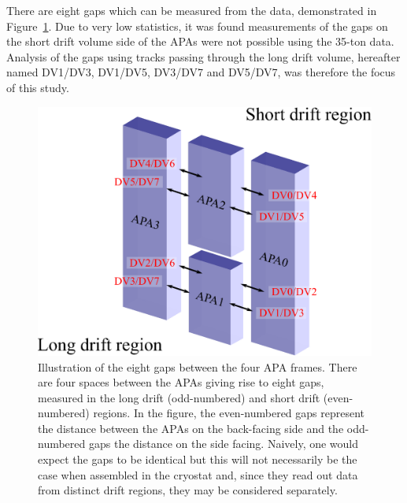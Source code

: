There are eight gaps which can be measured from the data, demonstrated in Figure~\ref{fig:APAGapCrossingGaps}.  Due to very low statistics, it was found measurements of the gaps on the short drift volume side of the APAs were not possible using the 35-ton data.  Analysis of the gaps using tracks passing through the long drift volume, hereafter named DV1/DV3, DV1/DV5, DV3/DV7 and DV5/DV7, was therefore the focus of this study.

\begin{figure}
  \centering
  \includegraphics[width=12cm]{APAGapCrossingGaps.eps}
  \caption{Illustration of the eight gaps between the four APA frames.  There are four spaces between the APAs giving rise to eight gaps, measured in the long drift (odd-numbered) and short drift (even-numbered) regions.  In the figure, the even-numbered gaps represent the distance between the APAs on the back-facing side and the odd-numbered gaps the distance on the side facing.  Naively, one would expect the gaps to be identical but this will not necessarily be the case when assembled in the cryostat and, since they read out data from distinct drift regions, they may be considered separately.}
  \label{fig:APAGapCrossingGaps}
\end{figure}

